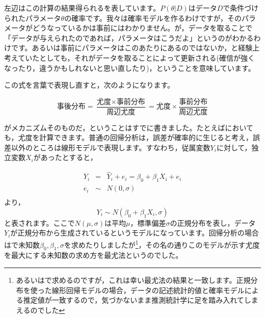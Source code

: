 \documentclass{ltjsbook}
\begin{document}
左辺はこの計算の結果得られるを表しています。$P(\theta|D)$はデータ$D$で条件づけられたパラメータ$\theta$の確率です。我々は確率モデルを作るわけですが，そのパラメータがどうなっているかは事前にはわかりません。が，データを取ることで「データが与えられたのであれば，パラメータはこうだよ」というのがわかるわけです。あるいは事前にパラメータはこのあたりにあるのではないか，と経験上考えていたとしても，それがデータを取ることによって更新される(確信が強くなったり，違うかもしれないと思い直したり)，ということを意味しています。

この式を言葉で表現し直すと，次のようになります。

$$ \mbox{事後分布} = \frac{\mbox{尤度}\times \mbox{事前分布}}{\mbox{周辺尤度}} = \mbox{尤度} \times \frac{事前分布}{周辺尤度}$$

がメカニズムそのものだ，ということはすでに書きました。たとえばにおいても，尤度を計算できます。普通の回帰分析は，誤差が確率的に生じると考え，誤差以外のところは線形モデルで表現します。すなわち，従属変数$Y_i$に対して，独立変数$X_i$があったとすると，

\begin{equation*}
    \begin{array}{lll}
        Y_i & =    & \hat{Y}_i + e_i = \beta_0 + \beta_1 X_i + e_i \\
        e_i & \sim & N(0,\sigma)                                   \\
    \end{array}
\end{equation*}
より，
$$ Y_i \sim N(\beta_0 + \beta_1 X_i, \sigma) $$
と表されます。ここで$N(\mu,\sigma)$は平均$\mu$，標準偏差$\sigma$の正規分布を表し，データ$Y_i$が正規分布から生成されているというモデルになっています。回帰分析の場合はで未知数$\beta_0,\beta_1,\sigma$を求めたりしましたが\footnote{あるいはで求めるのですが，これは幸い最尤法の結果と一致します。正規分布を使った線形回帰モデルの場合，データの記述統計的値と確率モデルによる推定値が一致するので，気づかないまま推測統計学に足を踏み入れてしまえるのでした}，その名の通りこのモデルが示す尤度を最大にする未知数の求め方を最尤法というのでした。
\end{document}
